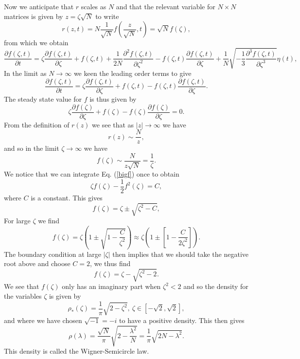 \documentclass[11pt]{report}
\begin{document}
Now we anticipate that $r$ scales as $N$ and that the relevant variable for $N\times N$
matrices is given by $z=\zeta \sqrt{N}$ to write
\begin{equation}
r(z,t) = N \frac{1}{\sqrt N} f(\frac{z}{\sqrt{N}},t) = \sqrt{N} f(\zeta),
\end{equation}
from which we obtain
\begin{equation}
\frac{\partial f(\zeta,t)}{\partial t} = \zeta\frac{\partial f(\zeta,t)}{\partial \zeta} + f(\zeta,t) + \frac{1}{2N}\frac{\partial^2 f(\zeta,t)}{\partial \zeta^2} - f(\zeta,t) \frac{\partial f(\zeta,t)}{\partial \zeta} +\frac{1}{N} \sqrt{- \frac{1}{3}\frac{\partial^3 f(\zeta,t)}{\partial \zeta^3}} \eta(t),
\end{equation}
In the limit as $N\to\infty$ we keen the leading order terms to give
\begin{equation}
\frac{\partial f(\zeta,t)}{\partial t} = \zeta\frac{\partial f(\zeta,t)}{\partial \zeta} + f(\zeta,t)  - f(\zeta,t) \frac{\partial f(\zeta,t)}{\partial \zeta} .
\end{equation}
The steady state value for $f$ is thus given by
\begin{equation}
\zeta\frac{\partial f(\zeta)}{\partial \zeta} + f(\zeta)  - f(\zeta) \frac{\partial f(\zeta)}{\partial \zeta}=0 \label{bigf}.
\end{equation}
From the definition of $r(z)$ we see that as $|z|\to\infty$ we have
\begin{equation}
r(z) \sim \frac{N}{z},
\end{equation}
and so in the limit $\zeta\to\infty$ we have
\begin{equation}
f(\zeta) \sim \frac{N}{z\sqrt{N} } = \frac{1}{\zeta}.
\end{equation}
We notice that we can integrate Eq. (\ref{bigf}) once to obtain
\begin{equation}
\zeta f(\zeta) -\frac{1}{2} f^2(\zeta) = C,
\end{equation}
where $C$ is a constant. This gives
\begin{equation}
f(\zeta) = \zeta \pm \sqrt{\zeta^2-C},
\end{equation}
For large $\zeta$ we find 
\begin{equation}
f(\zeta) = \zeta(1 \pm \sqrt{1-\frac{C}{\zeta^2}}) \approx \zeta(1 \pm [1-\frac{C}{2\zeta^2}]).
\end{equation}
The boundary condition at large $|\zeta|$ then implies that we should take the negative root above and choose $C=2$, we thus find
\begin{equation}
f(\zeta) = \zeta - \sqrt{\zeta^2-2}.
\end{equation}
We see that $f(\zeta)$ only has an imaginary part when $\zeta^2 <2$ and so the density for the variables $\zeta$ is given by
\begin{equation}
\rho_*(\zeta) = \frac{1}{\pi}  \sqrt{2-\zeta^2},\ \zeta\in [-\sqrt{2}, \sqrt{2}],
\end{equation}
and where we have chosen $\sqrt{-1}=-i$ to have a positive density. This then gives
\begin{equation}
\rho(\lambda) = \frac{\sqrt{N}}{\pi}\sqrt{2-\frac{\lambda^2}{N}}= \frac{1}{\pi}\sqrt{2N-\lambda^2}.
\end{equation}
This density is called the Wigner-Semicircle law.
\end{document}
